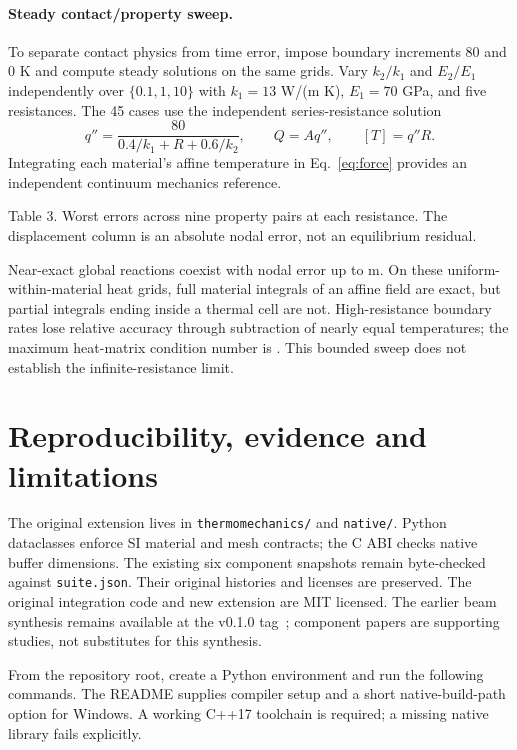 \documentclass[10pt,a4paper]{article}
\begin{document}
\paragraph{Steady contact/property sweep.}
To separate contact physics from time error, impose boundary increments 80 and 0 K and compute steady solutions on the same grids. Vary $k_2/k_1$ and $E_2/E_1$ independently over $\{0.1,1,10\}$ with $k_1=13$ W/(m K), $E_1=70$ GPa, and five resistances. The 45 cases use the independent series-resistance solution
\begin{equation}
 q''=\frac{80}{0.4/k_1+R+0.6/k_2},\qquad Q=Aq'',\qquad [T]=q''R.\label{eq:contact}
\end{equation}
Integrating each material's affine temperature in Eq.~\eqref{eq:force} provides an independent continuum mechanics reference.

\noindent Table 3. Worst errors across nine property pairs at each resistance. The displacement column is an absolute nodal error, not an equilibrium residual.

Near-exact global reactions coexist with nodal error up to \MaxContactDisplacement{} m. On these uniform-within-material heat grids, full material integrals of an affine field are exact, but partial integrals ending inside a thermal cell are not. High-resistance boundary rates lose relative accuracy through subtraction of nearly equal temperatures; the maximum heat-matrix condition number is \MaxContactCondition{}. This bounded sweep does not establish the infinite-resistance limit.

\section{Reproducibility, evidence and limitations}
The original extension lives in \texttt{thermomechanics/} and \texttt{native/}. Python dataclasses enforce SI material and mesh contracts; the C ABI checks native buffer dimensions. The existing six component snapshots remain byte-checked against \texttt{suite.json}. Their original histories and licenses are preserved. The original integration code and new extension are MIT licensed. The earlier beam synthesis remains available at the v0.1.0 tag~\cite{code}; component papers are supporting studies, not substitutes for this synthesis.

From the repository root, create a Python environment and run the following commands. The README supplies compiler setup and a short native-build-path option for Windows. A working C++17 toolchain is required; a missing native library fails explicitly.
\end{document}
